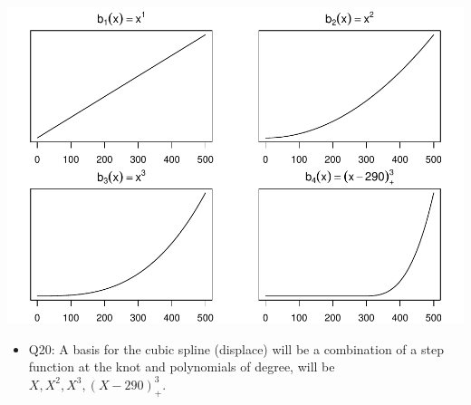 \documentclass[]{article}
\providecommand{\tightlist}{%
  \setlength{\itemsep}{0pt}\setlength{\parskip}{0pt}}
\begin{document}
\includegraphics{1_files/figure-latex/unnamed-chunk-9-2.pdf}

\begin{itemize}
\tightlist
\item
  Q20: A basis for the cubic spline (displace) will be a combination of
  a step function at the knot and polynomials of degree, will be
  \(X, X^2, X^3, (X-290)^3_+\).
\end{itemize}
\end{document}
